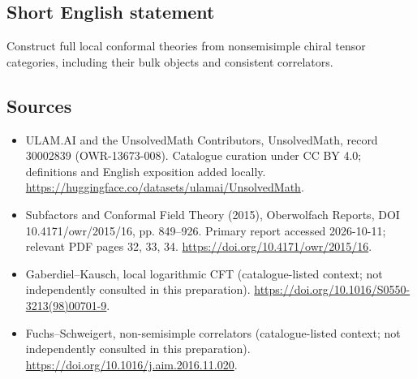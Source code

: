 \documentclass[11pt]{article}
\begin{document}
\subsection{Short English statement}
Construct full local conformal theories from nonsemisimple chiral tensor categories, including their bulk objects and consistent correlators.
\subsection{Sources}
\begin{itemize}
\item[\hypertarget{source:30002839:1}{S1}] ULAM.AI and the UnsolvedMath Contributors, UnsolvedMath, record 30002839 (OWR-13673-008). Catalogue curation under CC BY 4.0; definitions and English exposition added locally.
\url{https://huggingface.co/datasets/ulamai/UnsolvedMath}.
\item[\hypertarget{source:30002839:2}{S2}] Subfactors and Conformal Field Theory (2015), Oberwolfach Reports, DOI 10.4171/owr/2015/16, pp. 849--926. Primary report accessed 2026-10-11; relevant PDF pages 32, 33, 34.
\url{https://doi.org/10.4171/owr/2015/16}.
\item[\hypertarget{source:30002839:3}{S3}] Gaberdiel--Kausch, local logarithmic CFT (catalogue-listed context; not independently consulted in this preparation).
\url{https://doi.org/10.1016/S0550-3213(98)00701-9}.
\item[\hypertarget{source:30002839:4}{S4}] Fuchs--Schweigert, non-semisimple correlators (catalogue-listed context; not independently consulted in this preparation).
\url{https://doi.org/10.1016/j.aim.2016.11.020}.
\end{itemize}
\label{end:30002839}
\end{document}
